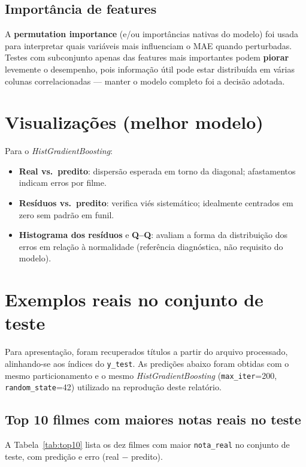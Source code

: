 \documentclass[11pt,a4paper]{article}
\begin{document}
\subsection{Importância de features}
A \textbf{permutation importance} (e/ou importâncias nativas do modelo) foi usada para interpretar quais variáveis mais influenciam o MAE quando perturbadas. Testes com subconjunto apenas das features mais importantes podem \textbf{piorar} levemente o desempenho, pois informação útil pode estar distribuída em várias colunas correlacionadas --- manter o modelo completo foi a decisão adotada.

\section{Visualizações (melhor modelo)}

Para o \emph{HistGradientBoosting}:
\begin{itemize}
  \item \textbf{Real vs.\ predito}: dispersão esperada em torno da diagonal; afastamentos indicam erros por filme.
  \item \textbf{Resíduos vs.\ predito}: verifica viés sistemático; idealmente centrados em zero sem padrão em funil.
  \item \textbf{Histograma dos resíduos} e \textbf{Q--Q}: avaliam a forma da distribuição dos erros em relação à normalidade (referência diagnóstica, não requisito do modelo).
\end{itemize}

\section{Exemplos reais no conjunto de teste}

Para apresentação, foram recuperados títulos a partir do arquivo processado, alinhando-se aos índices do \texttt{y\_test}. As predições abaixo foram obtidas com o mesmo particionamento e o mesmo \emph{HistGradientBoosting} (\texttt{max\_iter}=200, \texttt{random\_state}=42) utilizado na reprodução deste relatório.

\subsection{Top 10 filmes com maiores notas reais no teste}
A Tabela~\ref{tab:top10} lista os dez filmes com maior \texttt{nota\_real} no conjunto de teste, com predição e erro (real $-$ predito).
\end{document}
